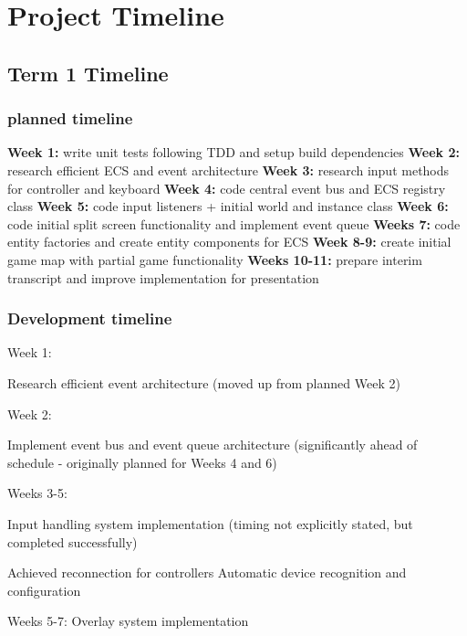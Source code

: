 \documentclass[]{final_report}
\begin{document}
\chapter{Project Timeline}
\section{Term 1 Timeline}
\subsection{planned timeline}
\textbf{ Week 1:} write unit tests following TDD and setup build dependencies \newline
\textbf{Week 2:} research efficient ECS and event architecture \newline
\textbf{Week 3:} research input methods for controller and keyboard \newline
\textbf{Week 4:} code central event bus and ECS registry class \newline
\textbf{Week 5:} code input listeners + initial world and instance class \newline
\textbf{Week 6:} code initial split screen functionality and implement event queue \newline
\textbf{Weeks 7:} code entity factories and create entity components for ECS \newline
\textbf{Week 8-9:} create initial game map with partial game functionality \newline
\textbf{Weeks 10-11:} prepare interim transcript and improve implementation for presentation \newline
\subsection{Development timeline}
Week 1:

Research efficient event architecture (moved up from planned Week 2)

Week 2:

Implement event bus and event queue architecture (significantly ahead of schedule - originally planned for Weeks 4 and 6)

Weeks 3-5:

Input handling system implementation (timing not explicitly stated, but completed successfully)

Achieved reconnection for controllers
Automatic device recognition and configuration

Weeks 5-7:
Overlay system implementation
\end{document}
